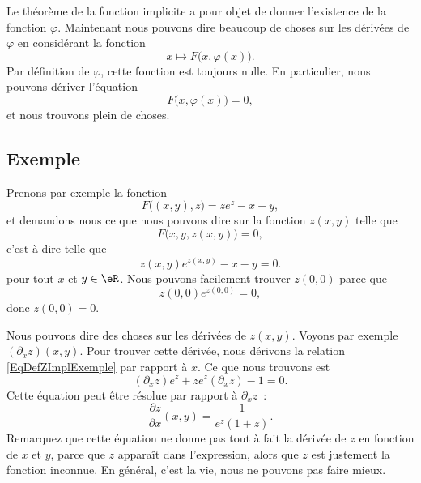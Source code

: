 Le théorème de la fonction implicite a pour objet de donner l'existence de la fonction $\varphi$. Maintenant nous pouvons dire beaucoup de choses sur les dérivées de $\varphi$ en considérant la fonction
\begin{equation}
	x\mapsto F\big( x,\varphi(x) \big).
\end{equation}
Par définition de $\varphi$, cette fonction est toujours nulle. En particulier, nous pouvons dériver l'équation
\begin{equation}
	F\big( x,\varphi(x) \big)=0,
\end{equation}
et nous trouvons plein de choses.

\subsection{Exemple}

Prenons par exemple la fonction
\begin{equation}
	F\big( (x,y),z \big)=ze^z-x-y,
\end{equation}
et demandons nous ce que nous pouvons dire sur la fonction $z(x,y)$ telle que
\begin{equation}
	F\big( x,y,z(x,y) \big)=0,
\end{equation}
c'est à dire telle que
\begin{equation}		\label{EqDefZImplExemple}
	z(x,y) e^{z(x,y)}-x-y=0.
\end{equation}
pour tout $x$ et $y\in\eR$. Nous pouvons facilement trouver $z(0,0)$ parce que
\begin{equation}
	z(0,0) e^{z(0,0)}=0,
\end{equation}
donc $z(0,0)=0$.

Nous pouvons dire des choses sur les dérivées de $z(x,y)$. Voyons par exemple $(\partial_xz)(x,y)$. Pour trouver cette dérivée, nous dérivons la relation \eqref{EqDefZImplExemple} par rapport à $x$. Ce que nous trouvons est
\begin{equation}
	(\partial_xz)e^z+ze^z(\partial_xz)-1=0.
\end{equation}
Cette équation peut être résolue par rapport à $\partial_xz$~:
\begin{equation}
	\frac{ \partial z }{ \partial x }(x,y)=\frac{1}{ e^z(1+z) }.
\end{equation}
Remarquez que cette équation ne donne pas tout à fait la dérivée de $z$ en fonction de $x$ et $y$, parce que $z$ apparaît dans l'expression, alors que $z$ est justement la fonction inconnue. En général, c'est la vie, nous ne pouvons pas faire mieux.

